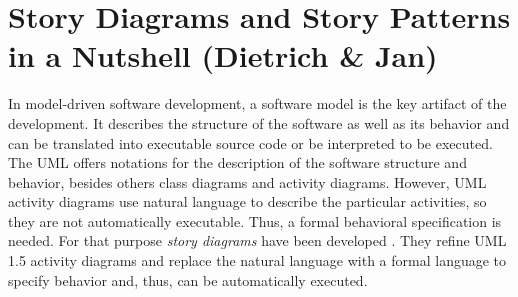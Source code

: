 \section{Story Diagrams and Story Patterns in a Nutshell (Dietrich \& Jan)} \label{sec:Overview}



In model-driven software development, a software model is the key artifact of the development.
It describes the structure of the software as well as its behavior and 
can be translated into executable source code or be interpreted to be executed.
The UML offers notations for the description of the software structure and behavior,
besides others class diagrams and activity diagrams.
However, UML activity diagrams use natural language to describe the particular activities, so they are not automatically executable.
Thus, a formal behavioral specification is needed.
For that purpose \emph{story diagrams} have been developed \cite{FNTZ00}.
They refine UML 1.5 \cite{UML1.5} activity diagrams and replace the natural language with a formal language to specify behavior
and, thus, can be automatically executed.


